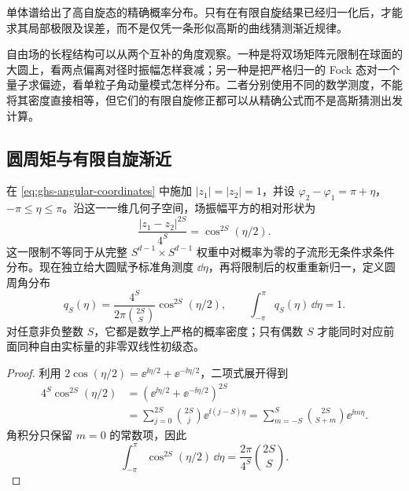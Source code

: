 单体谱给出了高自旋态的精确概率分布。只有在有限自旋结果已经归一化后，才能求其局部极限及误差，而不是仅凭一条形似高斯的曲线猜测渐近规律。


自由场的长程结构可以从两个互补的角度观察。一种是将双场矩阵元限制在球面的大圆上，看两点偏离对径时振幅怎样衰减；另一种是把严格归一的 Fock 态对一个量子求偏迹，看单粒子角动量模式怎样分布。二者分别使用不同的数学测度，不能将其密度直接相等，但它们的有限自旋修正都可以从精确公式而不是高斯猜测出发计算。


\subsection{圆周矩与有限自旋渐近}

\begin{definition}[大圆上的归一化场权重]
在 \cref{eq:ghs-angular-coordinates} 中施加 $|z_1|=|z_2|=1$，并设 $\varphi_2-\varphi_1=\pi+\eta$，$-\pi\le\eta\le\pi$。沿这一一维几何子空间，场振幅平方的相对形状为
\begin{equation}\label{eq:ghs-circle-antipodal-profile}
 \frac{|z_1-z_2|^{2S}}{4^S}
 =\cos^{2S}(\eta/2).
\end{equation}
这一限制不等同于从完整 $S^{d-1}\times S^{d-1}$ 权重中对概率为零的子流形无条件求条件分布。现在独立给大圆赋予标准角测度 $\dd\eta$，再将限制后的权重重新归一，定义圆周角分布
\begin{equation}\label{eq:ghs-circle-normalized-density}
 q_S(\eta)=\frac{4^S}{2\pi\binom{2S}{S}}\cos^{2S}(\eta/2),
 \qquad\int_{-\pi}^{\pi}q_S(\eta)\,\dd\eta=1.
\end{equation}
对任意非负整数 $S$，它都是数学上严格的概率密度；只有偶数 $S$ 才能同时对应前面同种自由实标量的非零双线性初级态。
\end{definition}

\begin{proof}
利用 $2\cos(\eta/2)=\ee^{\ii\eta/2}+\ee^{-\ii\eta/2}$，二项式展开得到
\begin{align*}
4^S\cos^{2S}(\eta/2)
&=(\ee^{\ii\eta/2}+\ee^{-\ii\eta/2})^{2S}\\
&=\sum_{j=0}^{2S}\binom{2S}{j}\ee^{\ii(j-S)\eta}
=\sum_{m=-S}^S\binom{2S}{S+m}\ee^{\ii m\eta}.
\end{align*}
角积分只保留 $m=0$ 的常数项，因此
\begin{equation*}
\int_{-\pi}^{\pi}\cos^{2S}(\eta/2)\,\dd\eta
=\frac{2\pi}{4^S}\binom{2S}{S}.
\end{equation*}
\end{proof}

